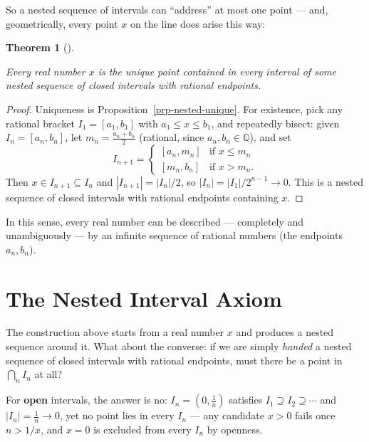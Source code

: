 \documentclass[
  letterpaper,
  DIV=11,
  numbers=noendperiod]{scrreprt}
\theoremstyle{plain}
\theoremstyle{plain}
\theoremstyle{definition}
\theoremstyle{definition}
\theoremstyle{definition}
\theoremstyle{plain}
\newtheorem{theorem}{Theorem}[chapter]
\theoremstyle{plain}
\theoremstyle{remark}
\begin{document}
So a nested sequence of intervals can ``address'' at most one point ---
and, geometrically, every point \(x\) on the line does arise this way:

\begin{theorem}[]\protect\hypertarget{thm-real-nested-intervals}{}\label{thm-real-nested-intervals}

\hfill\break
Every real number \(x\) is the unique point contained in every interval
of some nested sequence of closed intervals with rational endpoints.

\end{theorem}

\begin{proof}
Uniqueness is Proposition~\ref{prp-nested-unique}. For existence, pick
any rational bracket \(I_1=[a_1,b_1]\) with \(a_1 \le x \le b_1\), and
repeatedly bisect: given \(I_n=[a_n,b_n]\), let
\(m_n = \tfrac{a_n+b_n}{2}\) (rational, since \(a_n,b_n\in\mathbb{Q}\)),
and set \[
I_{n+1} = \begin{cases} [a_n,m_n] & \text{if } x \le m_n \\ [m_n,b_n] & \text{if } x > m_n. \end{cases}
\] Then \(x\in I_{n+1}\subseteq I_n\) and \(|I_{n+1}| = |I_n|/2\), so
\(|I_n| = |I_1|/2^{n-1} \to 0\). This is a nested sequence of closed
intervals with rational endpoints containing \(x\).
\end{proof}

In this sense, every real number can be described --- completely and
unambiguously --- by an infinite sequence of rational numbers (the
endpoints \(a_n,b_n\)).

\section{The Nested Interval Axiom}\label{the-nested-interval-axiom}

The construction above starts from a real number \(x\) and produces a
nested sequence around it. What about the converse: if we are simply
\emph{handed} a nested sequence of closed intervals with rational
endpoints, must there be a point in \(\bigcap_n I_n\) at all?

For \textbf{open} intervals, the answer is no: \(I_n = (0, \tfrac1n)\)
satisfies \(I_1 \supseteq I_2
\supseteq \cdots\) and \(|I_n| = \tfrac1n \to 0\), yet no point lies in
every \(I_n\) --- any candidate \(x>0\) fails once \(n > 1/x\), and
\(x=0\) is excluded from every \(I_n\) by openness.
\end{document}
